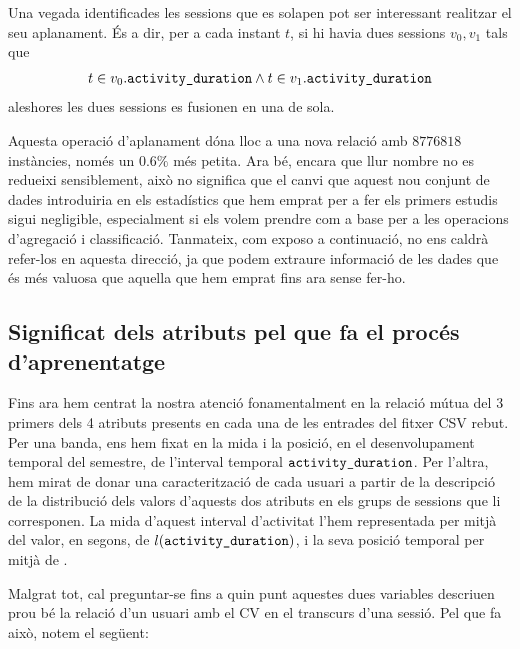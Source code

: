 \documentclass[
	a4paper,
	twoside,
	justified
]{tufte-book}
\begin{document}
Una vegada identificades les sessions que es solapen pot ser interessant realitzar el seu aplanament. És a dir, per a cada instant $t$, si hi havia dues sessions $v_0,v_1$ tals que
$$
	t \in v_0.\texttt{activity\_duration} \wedge t \in v_1.\texttt{activity\_duration}
$$
aleshores les dues sessions es fusionen en una de sola. 

Aquesta operació d'aplanament dóna lloc a una nova relació amb $8776818$ instàncies, només un $0.6\%$ més petita. Ara bé, encara que llur nombre no es redueixi sensiblement, això no significa que el canvi que aquest nou conjunt de dades introduiria en els estadístics que hem emprat per a fer els primers estudis sigui negligible, especialment si els volem prendre com a base per a les operacions d'agregació i classificació. Tanmateix, com exposo a continuació, no ens caldrà refer-los en aquesta direcció, ja que podem extraure informació de les dades que és més valuosa que aquella que hem emprat fins ara sense fer-ho.    

\subsection{Significat dels atributs pel que fa el procés d'aprenentatge}

Fins ara hem centrat la nostra atenció fonamentalment en la relació mútua del 3 primers dels 4 atributs presents en cada una de les entrades del fitxer CSV rebut. Per una banda, ens hem fixat en la mida i la posició, en el desenvolupament temporal del semestre, de l'interval temporal $\texttt{activity\_duration}$. Per l'altra, hem mirat de donar una caracterització de cada usuari a partir de la descripció de la distribució dels valors d'aquests dos atributs en els grups de sessions que li corresponen. La mida d'aquest interval d'activitat l'hem representada per mitjà del valor, en segons, de $l(\texttt{activity\_duration})$, i la seva posició temporal per mitjà de . 

Malgrat tot, cal preguntar-se fins a quin punt aquestes dues variables descriuen prou bé la relació d'un usuari amb el CV en el transcurs d'una sessió. Pel que fa això, notem el següent:
\end{document}
